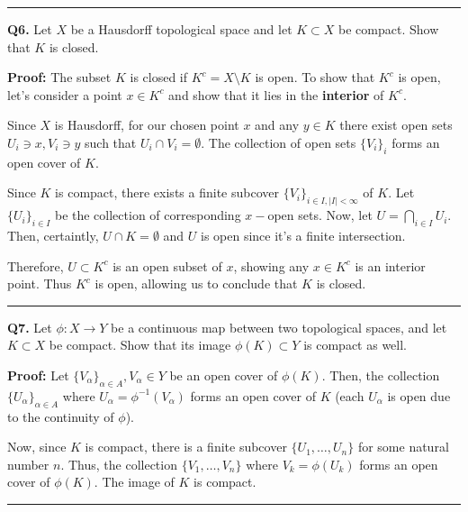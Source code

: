 \documentclass{article}
\begin{document}
\vskip 0.5cm
\hrule 
\vskip 0.5cm

\textbf{Q6.} Let $X$ be a Hausdorff topological space and let $K \subset X$ be compact. Show that $K$ is closed.

\vskip 0.5cm
\textbf{Proof:} 
The subset $K$ is closed if $K^c = X \setminus K$ is open. To show that $K^c$ is open, let's consider a point $x \in K^c$ and show that it lies in the \textbf{interior} of $K^c$.

\vskip 0.25cm
Since $X$ is Hausdorff, for our chosen point $x$ and any $y \in K$ there exist open sets $U_i \ni x, V_i \ni y$ such that $U_i \cap V_i = \emptyset$. The collection of open sets $\{V_i\}_{i}$ forms an open cover of $K$.

\vskip 0.25cm
Since $K$ is compact, there exists a finite subcover $\{V_i\}_{i \in I, |I|<\infty}$ of $K$. Let $\{U_i\}_{i \in I}$ be the collection of corresponding $x-$open sets. Now, let $U = \bigcap_{i \in I} U_i$. Then, certaintly, $U \cap K = \emptyset$ and $U$ is open since it's a finite intersection.

\vskip 0.25cm
Therefore, $U \subset K^c$ is an open subset of $x$, showing any $x \in K^c$ is an interior point. Thus $K^c$ is open, allowing us to conclude that $K$ is closed. 

\vskip 0.5cm
\hrule 
\vskip 0.5cm

\textbf{Q7.} Let $\phi : X \rightarrow Y$ be a continuous map between two topological spaces, and let $K \subset X$ be compact. Show that its image $\phi(K) \subset Y$ is compact as well. 

\vskip 0.5cm
\textbf{Proof:} 
Let $\{ V_{\alpha}\}_{\alpha \in A}, V_{\alpha} \in Y$ be an open cover of $\phi(K)$. Then, the collection $\{ U_{\alpha}\}_{\alpha \in A}$ where $U_{\alpha} = \phi^{-1}(V_{\alpha})$ forms an open cover of $K$ (each $U_{\alpha}$ is open due to the continuity of $\phi$).

\vskip 0.25cm
Now, since $K$ is compact, there is a finite subcover $\{ U_1, \dots, U_n \}$ for some natural number $n$. Thus, the collection $\{V_1, \dots, V_n\}$ where $V_k = \phi(U_k)$ forms an open cover of $\phi(K)$. The image of $K$ is compact.

\vskip 0.5cm
\hrule 
\vskip 0.5cm
\end{document}
